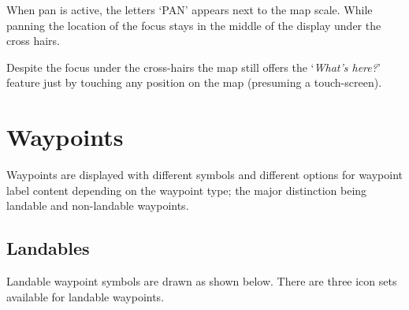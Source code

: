 When pan is active, the letters `PAN' appears next to the map scale.  While
panning the location of the focus stays in the middle of the display under the
cross hairs. 

Despite the focus under the cross-hairs the map
still offers the `\emph{What's here?}' feature just by touching any 
position on the map (presuming a touch-screen).


\section{Waypoints}\label{sec:waypoint-schemes}
Waypoints are displayed with different symbols and different options for
waypoint label content depending on the
waypoint type; the major distinction being landable and non-landable
waypoints.

\subsection*{Landables}
Landable waypoint symbols are drawn as shown below. There are three icon sets
available for landable waypoints. 

